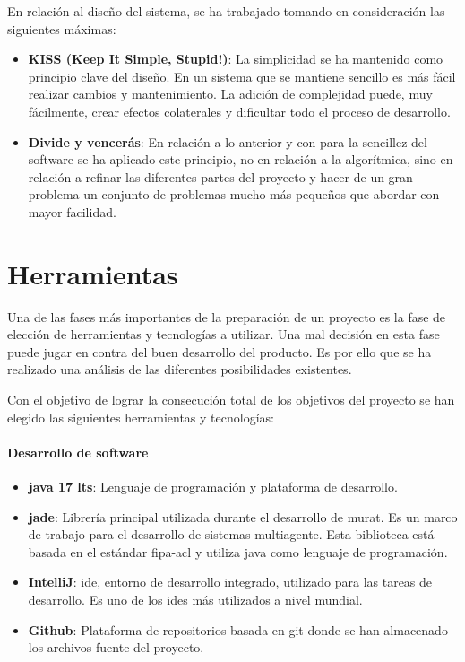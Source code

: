 En relación al diseño del sistema, se ha trabajado tomando en consideración las siguientes máximas: 
\begin{itemize}
    \item \textbf{KISS (Keep It Simple, Stupid!)}: La simplicidad se ha mantenido como principio clave del diseño. En un sistema que se mantiene sencillo es más fácil realizar cambios y mantenimiento. La adición de complejidad puede, muy fácilmente, crear efectos colaterales y dificultar todo el proceso de desarrollo.
    \item \textbf{Divide y vencerás}: En relación a lo anterior y con para la sencillez del software se ha aplicado este principio, no en relación a la algorítmica, sino en relación a refinar las diferentes partes del proyecto y hacer de un gran problema un conjunto de problemas mucho más pequeños que abordar con mayor facilidad.
\end{itemize}


\section{Herramientas}
Una de las fases más importantes de la preparación de un proyecto es la fase de elección de herramientas y tecnologías a utilizar. Una mal decisión en esta fase puede jugar en contra del buen desarrollo del producto. Es por ello que se ha realizado una análisis de las diferentes posibilidades existentes.

Con el objetivo de lograr la consecución total de los objetivos del proyecto se han elegido las siguientes herramientas y tecnologías:

\paragraph{Desarrollo de software}
\begin{itemize}
    \item \textbf{\Gls{java} 17 \acrshort{lts}}: Lenguaje de programación y plataforma de desarrollo.
    \item \textbf{\acrshort{jade}}: Librería principal utilizada durante el desarrollo de \acrshort{murat}. Es un marco de trabajo para el desarrollo de sistemas multiagente. Esta biblioteca está basada en el estándar \acrshort{fipa-acl} y utiliza \Gls{java} como lenguaje de programación.
    \item \textbf{IntelliJ}: \acrfull{ide}, entorno de desarrollo integrado, utilizado para las tareas de desarrollo. Es uno de los \acrshort{ide}s más utilizados a nivel mundial.
    \item \textbf{Github}: Plataforma de repositorios basada en \Gls{git} donde se han almacenado los archivos fuente del proyecto.
\end{itemize}

